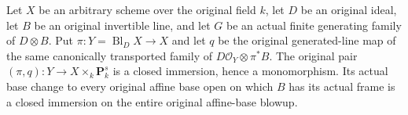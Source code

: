\begin{lemma}
\label{lem:kn-nadel-nef-big-same-global-pair-closed}
\leanok
{}
Let $X$ be an arbitrary scheme over the original field $k$, let $D$ be
an original ideal, let $B$ be an original invertible line, and let $G$ be
an actual finite generating family of $D\otimes B$.  Put
$\pi:Y=\operatorname{Bl}_D X\to X$ and let $q$ be the original generated-line
map of the same canonically transported family of
$D\mathcal O_Y\otimes\pi^*B$.  The original pair
$(\pi,q):Y\to X\times_k\mathbf P_k^s$ is a closed immersion, hence a
monomorphism.  Its actual base change to every original affine base open
on which $B$ has its actual frame is a closed immersion on the entire
original affine-base blowup.
\end{lemma}
